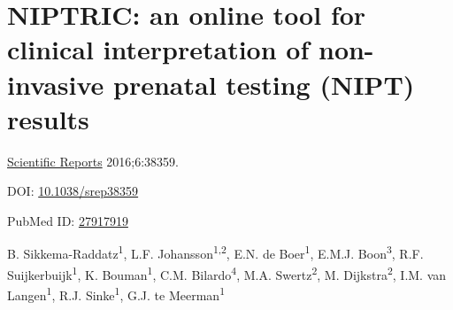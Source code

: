 \chapter[NIPTRIC: a tool for clinical interpretation of NIPT results]{NIPTRIC: an online tool for clinical interpretation of non-invasive prenatal testing (NIPT) results}
\label{chap:NIPTRIC}

{ \Large {} }

\hfill \underline{Scientific Reports} 2016;6:38359.

\hfill DOI: \href{https://doi.org/10.1038/srep38359}{10.1038/srep38359}

\hfill PubMed ID: \href{https://www.ncbi.nlm.nih.gov/pubmed/27917919}{27917919}

\newpage

\noindent
B. Sikkema-Raddatz\textsuperscript{1}, L.F. Johansson\textsuperscript{1,2}, E.N. de Boer\textsuperscript{1}, E.M.J. Boon\textsuperscript{3}, R.F. Suijkerbuijk\textsuperscript{1}, K. Bouman\textsuperscript{1}, C.M. Bilardo\textsuperscript{4}, M.A. Swertz\textsuperscript{2}, M. Dijkstra\textsuperscript{2}, I.M. van Langen\textsuperscript{1}, R.J. Sinke\textsuperscript{1}, G.J. te Meerman\textsuperscript{1} \\

